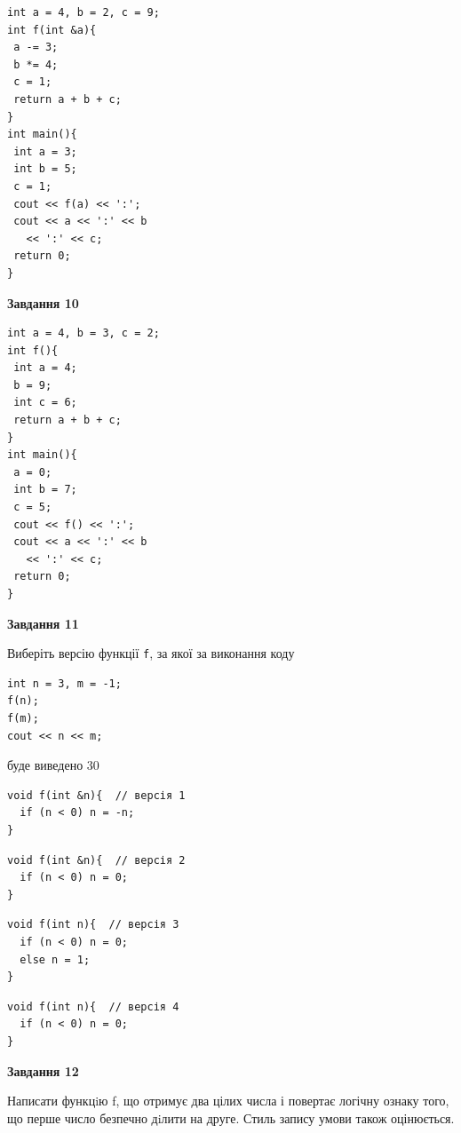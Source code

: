 \documentclass[12pt, ukrainian]{article}
\def\code#1{\Verb!#1!}
\begin{document}
{\begin {large}
\begin{minipage}[t]{7.0cm}
\begin{verbatim}
int a = 4, b = 2, c = 9;
int f(int &a){
 a -= 3;
 b *= 4;
 c = 1;
 return a + b + c;
}
int main(){
 int a = 3;
 int b = 5;
 c = 1;
 cout << f(a) << ':';
 cout << a << ':' << b 
   << ':' << c;
 return 0;
}
\end{verbatim}



\begin{center}
\textbf{Завдання 10}
\end{center}
\vspace{-8mm}

\begin{verbatim}
int a = 4, b = 3, c = 2;
int f(){
 int a = 4;
 b = 9;
 int c = 6;
 return a + b + c;
}
int main(){
 a = 0;
 int b = 7;
 c = 5;
 cout << f() << ':';
 cout << a << ':' << b 
   << ':' << c;
 return 0;
}
\end{verbatim}

\end{minipage}
\vline \hspace{1mm}
\begin{minipage}[t]{11.0cm}

\begin{center}
\textbf{Завдання 11}
\end{center}
Виберіть версію функції \code{f}, за якої за виконання коду
\begin{verbatim}
int n = 3, m = -1;
f(n);
f(m);
cout << n << m;
\end{verbatim}

буде виведено 30

\begin{verbatim}
void f(int &n){  // версія 1
  if (n < 0) n = -n;
}
\end{verbatim}

\vspace{-8mm}\begin{verbatim}
void f(int &n){  // версія 2
  if (n < 0) n = 0;
}
\end{verbatim}

\vspace{-8mm}\begin{verbatim}
void f(int n){  // версія 3
  if (n < 0) n = 0;
  else n = 1;
}
\end{verbatim}

\vspace{-8mm}\begin{verbatim}
void f(int n){  // версія 4
  if (n < 0) n = 0;
}
\end{verbatim}



\begin{center}
\textbf{Завдання 12}
\end{center}

Написати функцiю f, що отримує два цілих числа і повертає логічну ознаку того, що перше число безпечно дiлити на друге. Стиль запису умови також оцінюється.\par

\end{minipage}

\end {large}}
\newpage
\end{document}
